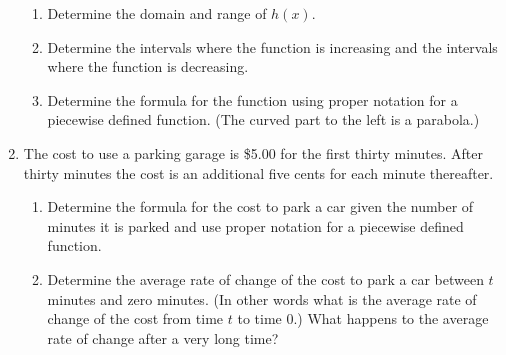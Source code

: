 \begin{enumerate}
    \begin{enumerate}
    \item Determine the domain and range of $h(x)$.
    \item Determine the intervals where the function is
      increasing and the intervals where the function is decreasing.
    \item Determine the formula for the function using
      proper notation for a piecewise defined function. (The curved
      part to the left is a parabola.)
    \end{enumerate}

\item The cost to use a parking garage is \$5.00 for the first
    thirty minutes. After thirty minutes the cost is an additional
    five cents for each minute thereafter.
    \begin{enumerate}
    \item Determine the formula for the cost to park a car given the
      number of minutes it is parked and use proper notation for a
      piecewise defined function.
    \item Determine the average rate of change of the cost to park a
      car between $t$ minutes and zero minutes. (In other words what
      is the average rate of change of the cost from time $t$ to time
      0.) What happens to the average rate of change after a very long
      time?
    \end{enumerate}

\end{enumerate}
